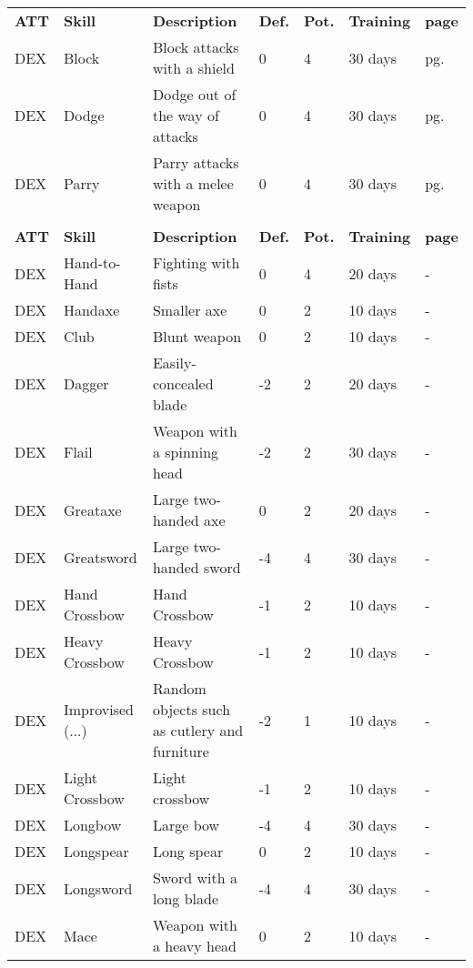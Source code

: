 \begin{center}
\begin{xltabular}{\textwidth}{l l X l l l l}
        \textbf{ATT} & \textbf{Skill} & \textbf{Description} & \textbf{Def.} & \textbf{Pot.} & \textbf{Training} & \textbf{page} \\*
        DEX & Block & Block attacks with a shield & 0 & 4 & 30 days & pg. \pageref{skill:block} \\
        DEX & Dodge & Dodge out of the way of attacks & 0 & 4 & 30 days & pg. \pageref{skill:dodge} \\
        DEX & Parry & Parry attacks with a melee weapon & 0 & 4 & 30 days & pg. \pageref{skill:parry} \\
         \\*
        \textbf{ATT} & \textbf{Skill} & \textbf{Description} & \textbf{Def.} & \textbf{Pot.} & \textbf{Training} & \textbf{page} \\*
        DEX & Hand-to-Hand & Fighting with fists & 0 & 4 & 20 days & - \\
        DEX & Handaxe & Smaller axe & 0 & 2 & 10 days & - \\
        DEX & Club & Blunt weapon & 0 & 2 & 10 days & - \\
        DEX & Dagger & Easily-concealed blade & -2 & 2 & 20 days & - \\
        DEX & Flail & Weapon with a spinning head & -2 & 2 & 30 days & - \\ %
        DEX & Greataxe & Large two-handed axe & 0 & 2 & 20 days & - \\
        DEX & Greatsword & Large two-handed sword & -4 & 4 & 30 days & - \\ %
        DEX & Hand Crossbow & Hand Crossbow & -1 & 2 & 10 days & - \\
        DEX & Heavy Crossbow & Heavy Crossbow & -1 & 2 & 10 days & - \\
        DEX & Improvised (...) & Random objects such as cutlery and furniture & -2 & 1 & 10 days & - \\
        DEX & Light Crossbow & Light crossbow & -1 & 2 & 10 days & - \\
        DEX & Longbow & Large bow & -4 & 4 & 30 days & - \\ %
        DEX & Longspear & Long spear & 0 & 2 & 10 days & - \\
        DEX & Longsword & Sword with a long blade & -4 & 4 & 30 days & - \\
        DEX & Mace & Weapon with a heavy head & 0 & 2 & 10 days & - \\ %

\end{xltabular}
\end{center}

